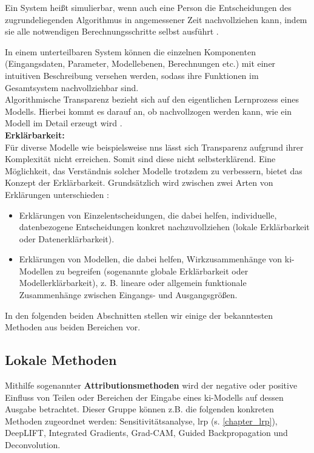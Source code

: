 \documentclass[twoside, 12pt,a4paper]{book}
\numberwithin{equation}{section}
\begin{document}
	\noindent Ein System heißt simulierbar, wenn
	auch eine Person die Entscheidungen des zugrundeliegenden Algorithmus in angemessener
	Zeit nachvollziehen kann, indem sie alle notwendigen  Berechnungsschritte selbst ausführt \cite{lipton}.
	
	\noindent In einem unterteilbaren System können die einzelnen Komponenten (Eingangsdaten, Parameter,
	Modellebenen, Berechnungen etc.) mit einer intuitiven
	Beschreibung versehen werden, sodass ihre Funktionen
	im Gesamtsystem nachvollziehbar sind.\\
	Algorithmische Transparenz bezieht sich auf den eigentlichen Lernprozess eines Modells. Hierbei kommt es darauf an, ob nachvollzogen werden kann, wie ein Modell im Detail erzeugt wird \cite{kistudie}.\\

	\noindent \textbf{Erklärbarkeit: }\\
	Für diverse Modelle wie beispielsweise \acp{nn} lässt sich Transparenz aufgrund ihrer Komplexität nicht erreichen. Somit sind diese nicht selbsterklärend. Eine Möglichkeit, das Verständnis solcher Modelle trotzdem zu verbessern, bietet das Konzept der Erklärbarkeit. Grundsätzlich wird zwischen zwei Arten von Erklärungen unterschieden \cite{kistudie}:
	
	\begin{itemize}
		\item Erklärungen von Einzelentscheidungen, die dabei helfen, individuelle, datenbezogene Entscheidungen konkret nachzuvollziehen (lokale Erklärbarkeit oder Datenerklärbarkeit).
		\item Erklärungen von Modellen,	die dabei helfen, Wirkzusammenhänge von \ac{ki}-Modellen zu begreifen (sogenannte globale Erklärbarkeit
		oder Modellerklärbarkeit), z. B. lineare oder allgemein funktionale Zusammenhänge zwischen Eingangs- und Ausgangsgrößen.
	\end{itemize}
	
	\noindent In den folgenden beiden Abschnitten stellen wir einige der bekanntesten Methoden aus beiden Bereichen vor.

	\subsection{Lokale Methoden}\label{chapter:localmethods}
	
	\noindent Mithilfe sogenannter \textbf{Attributionsmethoden} wird der
	negative oder positive Einfluss von Teilen oder Bereichen der Eingabe eines \ac{ki}-Modells auf dessen Ausgabe	betrachtet. Dieser Gruppe können z.B. die folgenden konkreten Methoden zugeordnet
	werden: Sensitivitätsanalyse, \ac{lrp} (s. \autoref{chapter_lrp}), DeepLIFT, Integrated Gradients, Grad-CAM, Guided Backpropagation und
	Deconvolution.\\
	
\end{document}
